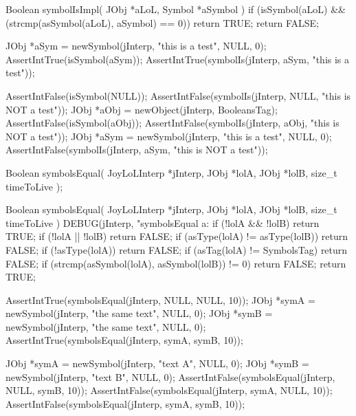 \startCCode
Boolean symbolIsImpl(
  JObj *aLoL,
  Symbol *aSymbol
) {
  if (isSymbol(aLoL) &&
      (strcmp(asSymbol(aLoL), aSymbol) == 0)) {
    return TRUE;
  }
  return FALSE;
}
\stopCCode


\startCTest
  JObj *aSym = newSymbol(jInterp, "this is a test", NULL, 0);
  AssertIntTrue(isSymbol(aSym));
  AssertIntTrue(symbolIs(jInterp, aSym, "this is a test"));
\stopCTest
\stopTestCase

\startCTest
  AssertIntFalse(isSymbol(NULL));
  AssertIntFalse(symbolIs(jInterp, NULL, "this is NOT a test"));
  JObj *aObj = newObject(jInterp, BooleansTag);
  AssertIntFalse(isSymbol(aObj));
  AssertIntFalse(symbolIs(jInterp, aObj, "this is NOT a test"));
  JObj *aSym = newSymbol(jInterp, "this is a test", NULL, 0);
  AssertIntFalse(symbolIs(jInterp, aSym, "this is NOT a test"));
\stopCTest
\stopTestCase
\stopTestSuite


\startCHeader
Boolean symbolsEqual(
  JoyLoLInterp *jInterp,
  JObj         *lolA,
  JObj         *lolB,
  size_t        timeToLive
);
\stopCHeader
{}

\startCCode
Boolean symbolsEqual(
  JoyLoLInterp *jInterp,
  JObj         *lolA,
  JObj         *lolB,
  size_t        timeToLive
) {
  DEBUG(jInterp, "symbolsEqual a:%
  if (!lolA && !lolB) return TRUE;
  if (!lolA || !lolB) return FALSE;
  if (asType(lolA) != asType(lolB)) return FALSE;
  if (!asType(lolA)) return FALSE;
  if (asTag(lolA) != SymbolsTag) return FALSE;
  if (strcmp(asSymbol(lolA), asSymbol(lolB)) != 0) return FALSE;
  return TRUE;
}
\stopCCode


\startCTest
  AssertIntTrue(symbolsEqual(jInterp, NULL, NULL, 10));
  JObj *symA = newSymbol(jInterp, "the same text", NULL, 0);
  JObj *symB = newSymbol(jInterp, "the same text", NULL, 0);
  AssertIntTrue(symbolsEqual(jInterp, symA, symB, 10));
\stopCTest
\stopTestCase


\startCTest
  JObj *symA = newSymbol(jInterp, "text A", NULL, 0);
  JObj *symB = newSymbol(jInterp, "text B", NULL, 0);
  AssertIntFalse(symbolsEqual(jInterp, NULL, symB, 10));
  AssertIntFalse(symbolsEqual(jInterp, symA, NULL, 10));
  AssertIntFalse(symbolsEqual(jInterp, symA, symB, 10));
\stopCTest
\stopTestCase
\stopTestSuite


